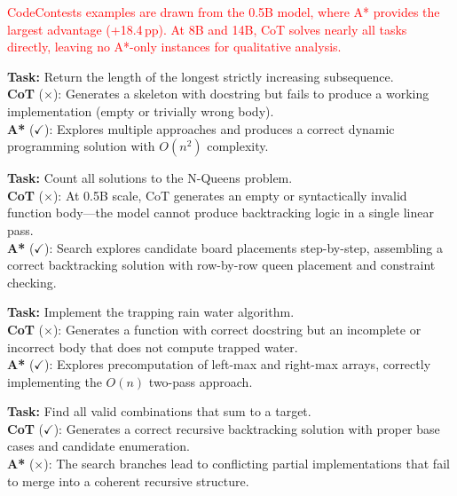 \documentclass[11pt]{article}
\begin{document}
{{\textcolor{red}{CodeContests examples are drawn from the 0.5B model, where A* provides the largest advantage (+18.4\,pp). At 8B and 14B, CoT solves nearly all tasks directly, leaving no A*-only instances for qualitative analysis.}

\begin{examplebox}[title=CC/0 --- A* Correct{,} CoT Wrong (0.5B)]
\textbf{Task:} Return the length of the longest strictly increasing subsequence.\\[4pt]
\textbf{CoT} ($\times$): Generates a skeleton with docstring but fails to produce a working implementation (empty or trivially wrong body).\\[4pt]
\textbf{A*} ($\checkmark$): Explores multiple approaches and produces a correct dynamic programming solution with $O(n^2)$ complexity.
\end{examplebox}

\begin{examplebox}[title=CC/4 --- A* Correct{,} CoT Wrong (0.5B)]
\textbf{Task:} Count all solutions to the N-Queens problem.\\[4pt]
\textbf{CoT} ($\times$): At 0.5B scale, CoT generates an empty or syntactically invalid function body---the model cannot produce backtracking logic in a single linear pass.\\[4pt]
\textbf{A*} ($\checkmark$): Search explores candidate board placements step-by-step, assembling a correct backtracking solution with row-by-row queen placement and constraint checking.
\end{examplebox}

\begin{examplebox}[title=CC/6 --- A* Correct{,} CoT Wrong (0.5B)]
\textbf{Task:} Implement the trapping rain water algorithm.\\[4pt]
\textbf{CoT} ($\times$): Generates a function with correct docstring but an incomplete or incorrect body that does not compute trapped water.\\[4pt]
\textbf{A*} ($\checkmark$): Explores precomputation of left-max and right-max arrays, correctly implementing the $O(n)$ two-pass approach.
\end{examplebox}

\begin{examplebox}[title=CC/7 --- CoT Correct{,} A* Wrong (0.5B)]
\textbf{Task:} Find all valid combinations that sum to a target.\\[4pt]
\textbf{CoT} ($\checkmark$): Generates a correct recursive backtracking solution with proper base cases and candidate enumeration.\\[4pt]
\textbf{A*} ($\times$): The search branches lead to conflicting partial implementations that fail to merge into a coherent recursive structure.
\end{examplebox}

}}
\end{document}
